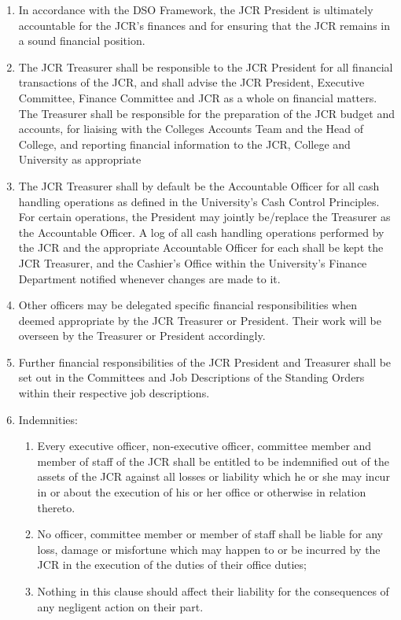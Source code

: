 \label{sc: JCR Finances}
\begin{enumerate}
    \item In accordance with the DSO Framework, the JCR President is ultimately accountable for the JCR’s finances and for ensuring that the JCR remains in a sound financial position.
    \item  The JCR Treasurer shall be responsible to the JCR President for all financial transactions of the JCR, and shall advise the JCR President, Executive Committee, Finance Committee and JCR as a whole on financial matters. The Treasurer shall be responsible for the preparation of the JCR budget and accounts, for liaising with the Colleges Accounts Team and the Head of College, and reporting financial information to the JCR, College and University as appropriate
    \item  The JCR Treasurer shall by default be the Accountable Officer for all cash handling operations as defined in the University’s Cash Control Principles. For certain operations, the President may jointly be/replace the Treasurer as the Accountable Officer. A log of all cash handling operations performed by the JCR and the appropriate Accountable Officer for each shall be kept the JCR Treasurer, and the Cashier’s Office within the University’s Finance Department notified whenever changes are made to it.
    \item Other officers may be delegated specific financial responsibilities when deemed appropriate by the JCR Treasurer or President. Their work will be overseen by the Treasurer or President accordingly.
    \item  Further financial responsibilities of the JCR President and Treasurer shall be set out in the Committees and Job Descriptions of the Standing Orders within their respective job descriptions.
    \item Indemnities:
    \begin{enumerate}
        \item Every executive officer, non-executive officer, committee member and member of staff of the JCR shall be entitled to be indemnified out of the assets of the JCR against all losses or liability which he or she may incur in or about the execution of his or her office or otherwise in relation thereto.
        \item  No officer, committee member or member of staff shall be liable for any loss, damage or misfortune which may happen to or be incurred by the JCR in the execution of the duties of their office duties;
        \item  Nothing in this clause should affect their liability for the consequences of any negligent action on their part.
    \end{enumerate}
\end{enumerate}

